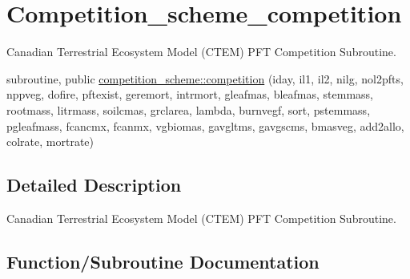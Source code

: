 \hypertarget{group__competition__scheme__competition}{}\section{Competition\+\_\+scheme\+\_\+competition}
\label{group__competition__scheme__competition}


Canadian Terrestrial Ecosystem Model (C\+T\+E\+M) P\+F\+T Competition Subroutine.  


\begin{DoxyCompactItemize}
\item 
subroutine, public \hyperlink{group__competition__scheme__competition_ga42c6fcccc542b3c3711cae7881d30665}{competition\+\_\+scheme\+::competition} (iday, il1, il2, nilg, nol2pfts, nppveg, dofire, pftexist, geremort, intrmort, gleafmas, bleafmas, stemmass, rootmass, litrmass, soilcmas, grclarea, lambda, burnvegf, sort, pstemmass, pgleafmass, fcancmx, fcanmx, vgbiomas, gavgltms, gavgscms, bmasveg, add2allo, colrate, mortrate)
\end{DoxyCompactItemize}


\subsection{Detailed Description}
Canadian Terrestrial Ecosystem Model (C\+T\+E\+M) P\+F\+T Competition Subroutine. 



\subsection{Function/\+Subroutine Documentation}
\hypertarget{group__competition__scheme__competition_ga42c6fcccc542b3c3711cae7881d30665}{}
